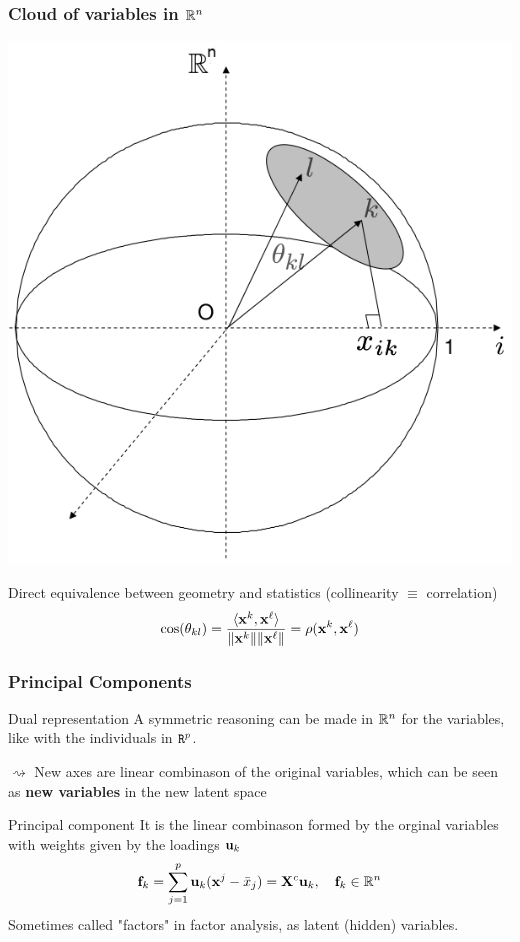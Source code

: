 \documentclass{beamer}\usepackage[]{graphicx}\usepackage[]{color}
\begin{document}
\begin{frame}
  \frametitle{Cloud of variables in $\mathbb{R}^n$}
  
  \begin{center}
    \includegraphics[width=.45\textwidth]{nuage_var}
  \end{center}

  Direct equivalence between geometry and statistics (collinearity $\equiv$ correlation) 
  \begin{equation*}
    \cos(\theta_{kl}) = \frac{\langle \mathbf{x}^k ,\mathbf{x}^\ell \rangle}{\|\mathbf{x}^k\| \|\mathbf{x}^\ell\|} = \rho(\mathbf{x}^k,\mathbf{x}^\ell)
  \end{equation*}

\end{frame}

\begin{frame}
  \frametitle{Principal Components}
  
  \begin{block}{Dual representation}
    A symmetric reasoning can be made in $\mathbb{R}^n$ for the variables, like with the individuals in $\texttt{R}^p$.
    
    $\rightsquigarrow$ New axes are linear combinason of the original variables, which can be seen as \alert{\bf new variables} in the new latent space
  \end{block}

  \begin{block}{Principal component}
    It is the linear combinason formed by the orginal variables with weights given by the loadings $\mathbf{u}_k$
    \begin{equation*}
      \mathbf{f}_{k}  = \sum_{j=1}^p \mathbf{u}_k (\mathbf{x}^{j} - \bar{x}_j) = \mathbf{X}^c \mathbf{u}_k, \quad \mathbf{f}_k \in \mathbb{R}^n
    \end{equation*}
    Sometimes called \alert{"factors"} in  factor analysis, as \alert{latent (hidden) variables}. 
  \end{block}

\end{frame}
\end{document}
